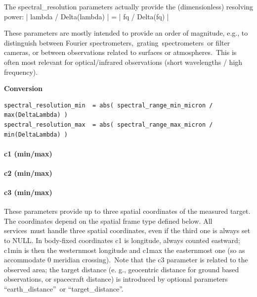 \documentclass[11pt,a4paper]{ivoa}
\begin{document}
The spectral\_resolution parameters actually provide the (dimensionless) resolving power: | lambda / Delta(lambda) | = | fq / Delta(fq) |  

These parameters are mostly intended to provide an order of magnitude, e.g., to distinguish between Fourier spectrometers, grating spectrometers or filter cameras, or between observations related to surfaces or atmospheres. This is often most relevant for optical/infrared observations (short wavelengths / high frequency).





\textbf{Conversion}




\begin{verbatim}
spectral_resolution_min  = abs( spectral_range_min_micron / max(DeltaLambda) )
spectral_resolution_max  = abs( spectral_range_max_micron / min(DeltaLambda) )
\end{verbatim}




\paragraph{c1 (min/max)}

\paragraph{c2 (min/max)}

\paragraph{c3 (min/max)}

These parameters provide up to three spatial coordinates of the measured target. The coordinates depend on the spatial frame type defined below. All services must handle three spatial coordinates, even if the third one is always set to NULL. In body-fixed coordinates c1 is longitude, always counted eastward; c1min is then the westernmost longitude and c1max the easternmost one (so as accommodate 0 meridian crossing). Note that the c3 parameter is related to the observed area; the target distance (e. g., geocentric distance for ground based observations, or spacecraft distance) is introduced by optional parameters  ``earth\_distance'' or ``target\_distance''.
\end{document}
